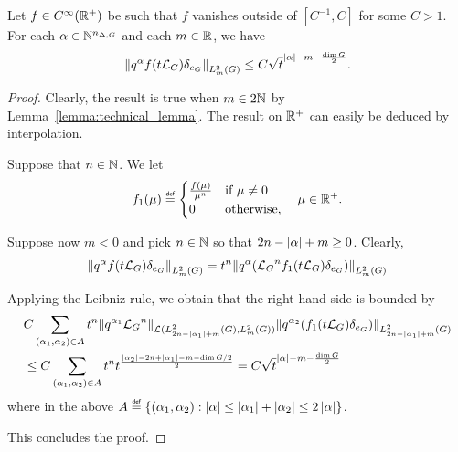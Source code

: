 \begin{corollary}
\label{corollary:technical_lemma}
    Let $f \in \SmoothFunctions {\R^+}$ be such that $f$ vanishes outside of $[C^{-1}, C]$ for some $C > 1$.
    For each $\alpha \in \N^{\dimDifferenceOperators}$ and each $m \in \R$,
    we have
    \begin{align*}
        \norm [\Sobolev m] {
            q^\alpha f(t \Laplacian) \delta_{e_\Group}
        }
        \leq C \sqrt t^{\abs \alpha - m - \frac {\dim \Group} 2}.
    \end{align*}
\end{corollary}
\begin{proof}
    Clearly, the result is true when $m \in 2\N$ by Lemma~\ref{lemma:technical_lemma}.
    The result on $\R^+$ can easily be deduced by interpolation.

    Suppose that $n \in \N$.
    We let
    \begin{align*}
        f_1(\mu) \defeq
        \begin{cases}
            \frac {f(\mu)}{\mu^n} & \text{if } \mu \neq 0\\
            0 & \text{otherwise},
        \end{cases}
        \quad \mu \in \R^+.
    \end{align*}

    Suppose now $m < 0$ and pick $n \in \N$
    so that $2n - \abs \alpha + m \geq 0$.
    Clearly,
    \begin{align*}
        \norm [\Sobolev m] {
            q^\alpha f(t \Laplacian) \delta_{e_\Group}
        }
        =
        t^n
        \norm [\Sobolev m] {
            q^\alpha (\Laplacian^n f_1(t \Laplacian) \delta_{e_\Group})
        }
    \end{align*}

    Applying the Leibniz rule, we obtain that the right-hand side is bounded by
    \begin{align*}
        &C \sum_{(\alpha_1, \alpha_2) \in A}
        t^n
        \norm [\Lin {\Sobolev {2 n - \abs {\alpha_1} + m}, \Sobolev m}] {
            q^{\alpha_1}
            \Laplacian^n
        }
        \norm [\Sobolev {2 n - \abs {\alpha_1} + m}] {
            q^{\alpha_2} (f_1(t \Laplacian) \delta_{e_\Group})
        }\\
        &\leq C
        \sum_{(\alpha_1, \alpha_2) \in A}
        t^n t^{\frac {\abs {\alpha_2} - 2 n + \abs {\alpha_1} - m - \dim \Group/2} 2}
        = C \sqrt t^{\abs \alpha - m - \frac {\dim \Group} 2}
    \end{align*}
    where in the above
    $A \defeq \{(\alpha_1, \alpha_2) : \abs \alpha \leq \abs {\alpha_1} + \abs {\alpha_2} \leq 2 \abs \alpha\}$.

    This concludes the proof.
\end{proof}

